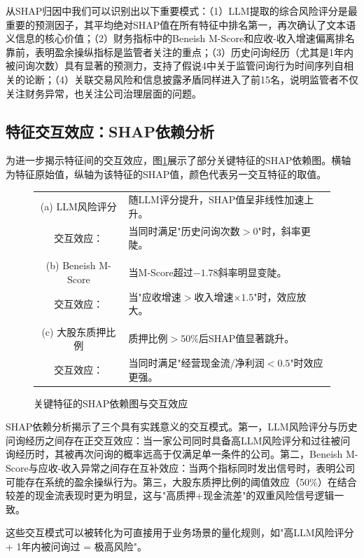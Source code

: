 从SHAP归因中我们可以识别出以下重要模式：（1）LLM提取的综合风险评分是最重要的预测因子，其平均绝对SHAP值在所有特征中排名第一，再次确认了文本语义信息的核心价值；（2）财务指标中的Beneish M-Score和应收-收入增速偏离排名靠前，表明盈余操纵指标是监管者关注的重点；（3）历史问询经历（尤其是1年内被问询次数）具有显著的预测力，支持了假说4中关于监管问询行为时间序列自相关的论断；（4）关联交易风险和信息披露矛盾同样进入了前15名，说明监管者不仅关注财务异常，也关注公司治理层面的问题。

\subsection{特征交互效应：SHAP依赖分析}

为进一步揭示特征间的交互效应，图\ref{fig:shap_dependence}展示了部分关键特征的SHAP依赖图。横轴为特征原始值，纵轴为该特征的SHAP值，颜色代表另一交互特征的取值。

\begin{figure}[H]
\centering
\small
\begin{tabular}{cl}
(a) LLM风险评分 &\quad 随LLM评分提升，SHAP值呈非线性加速上升。\\
  交互效应： &\quad 当同时满足"历史问询次数$>$0"时，斜率更陡。 \\
\\
(b) Beneish M-Score &\quad 当M-Score超过$-1.78$斜率明显变陡。\\
  交互效应： &\quad 当"应收增速$>$收入增速$\times 1.5$"时，效应放大。 \\
\\
(c) 大股东质押比例 &\quad 质押比例$>50\%$后SHAP值显著跳升。\\
  交互效应： &\quad 当同时满足"经营现金流/净利润$<0.5$"时效应更强。 \\
\end{tabular}
\caption{关键特征的SHAP依赖图与交互效应}
\label{fig:shap_dependence}
\end{figure}

SHAP依赖分析揭示了三个具有实践意义的交互模式。第一，LLM风险评分与历史问询经历之间存在正交互效应：当一家公司同时具备高LLM风险评分和过往被问询经历时，其被再次问询的概率远高于仅满足单一条件的公司。第二，Beneish M-Score与应收-收入异常之间存在互补效应：当两个指标同时发出信号时，表明公司可能存在系统的盈余操纵行为。第三，大股东质押比例的阈值效应（50\%）在结合较差的现金流表现时更为明显，这与"高质押+现金流差"的双重风险信号逻辑一致。

这些交互模式可以被转化为可直接用于业务场景的量化规则，如"高LLM风险评分 + 1年内被问询过 = 极高风险"。

